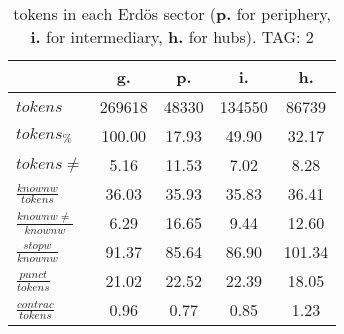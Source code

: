 \begin{table}[h!]
\begin{center}
\begin{tabular}{| l || c | c | c | c |}\hline
 & {\bf g.} & {\bf p.} & {\bf i.} & {\bf h.} \\\hline\hline
$tokens$ & 269618  & 48330  & 134550  & 86739 \\
$tokens_{\%}$ & 100.00  & 17.93  & 49.90  & 32.17 \\
$tokens \neq$ & 5.16  & 11.53  & 7.02  & 8.28 \\\hline
$\frac{knownw}{tokens}$ & 36.03  & 35.93  & 35.83  & 36.41 \\
$\frac{knownw \neq}{knownw}$ & 6.29  & 16.65  & 9.44  & 12.60 \\\hline
$\frac{stopw}{knownw}$ & 91.37  & 85.64  & 86.90  & 101.34 \\
$\frac{punct}{tokens}$ & 21.02  & 22.52  & 22.39  & 18.05 \\
$\frac{contrac}{tokens}$ & 0.96  & 0.77  & 0.85  & 1.23 \\\hline
\end{tabular}
\caption{tokens in each Erd\"os sector ({{\bf p.}} for periphery, {{\bf i.}} for intermediary, 
    {{\bf h.}} for hubs). TAG: 2}
\end{center}
\end{table}